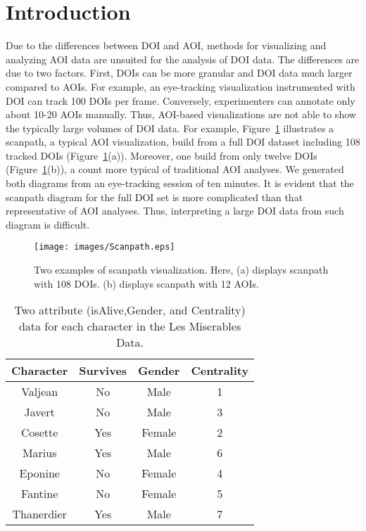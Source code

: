 \section{Introduction}
Due to the differences between DOI and AOI, methods for visualizing and analyzing AOI data are unsuited for the analysis of DOI data. The differences are due to two factors. First, DOIs can be more granular and DOI data much larger compared to AOIs. For example, an eye-tracking visualization instrumented with DOI can track 100 DOIs per frame. Conversely, experimenters can annotate only about 10-20 AOIs manually. Thus, AOI-based visualizations are not able to show the typically large volumes of DOI data. For example, Figure~\ref{fig:Scanpath} illustrates a scanpath, a typical AOI visualization,  build from a full DOI dataset including 108 tracked DOIs (Figure~\ref{fig:Scanpath}(a)). Moreover, one build from only twelve DOIs (Figure~\ref{fig:Scanpath}(b)), a count more typical of traditional AOI analyses. We generated both diagrams from an eye-tracking session of ten minutes. It is evident that the scanpath diagram for the full DOI set is more complicated than that representative of AOI analyses. Thus, interpreting a large DOI data from such diagram is difficult. 

\begin{figure}[htb]
  \centering
  \texttt{[image: images/Scanpath.eps]}
  \caption{Two examples of scanpath visualization. Here, (a) displays scanpath with 108 DOIs. (b) displays scanpath with 12 AOIs. }
	\label{fig:Scanpath}
\end{figure}

\begin{table}[htbp]
\caption{Two attribute (isAlive,Gender, and Centrality) data for each character in the Les Miserables Data. }
	\centering
		\begin{tabular}{|c|c|c|c|}
				\hline
				\textbf{Character}	& \textbf{Survives} &	\textbf{Gender}	& \textbf{Centrality}\\\hline
			
				Valjean	& No	&Male	&1\\\hline
Javert	&No&	Male&	3\\\hline
Cosette 	&Yes	&Female&	2\\\hline
Marius	&Yes	&Male&	6\\\hline
Eponine	&No	&Female&	4\\\hline
Fantine	&No	&Female	&5\\\hline
Thanerdier	&Yes	&Male	&7\\\hline

		\end{tabular}
		
		\label{tab:LesMiserablesAttribute}
\end{table}

